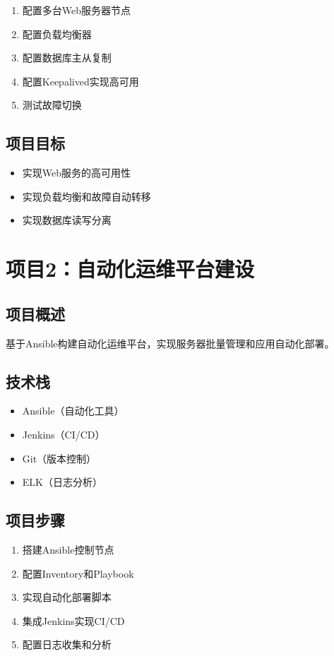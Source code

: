 \documentclass[12pt,UTF8]{ctexbook}
\begin{document}
\begin{enumerate}
    \item 配置多台Web服务器节点
    \item 配置负载均衡器
    \item 配置数据库主从复制
    \item 配置Keepalived实现高可用
    \item 测试故障切换
\end{enumerate}

\subsection*{项目目标}

\begin{itemize}
    \item 实现Web服务的高可用性
    \item 实现负载均衡和故障自动转移
    \item 实现数据库读写分离
\end{itemize}

\section{项目2：自动化运维平台建设}
\label{sec:project-automation}

\subsection*{项目概述}

基于Ansible构建自动化运维平台，实现服务器批量管理和应用自动化部署。

\subsection*{技术栈}

\begin{itemize}
    \item Ansible（自动化工具）
    \item Jenkins（CI/CD）
    \item Git（版本控制）
    \item ELK（日志分析）
\end{itemize}

\subsection*{项目步骤}

\begin{enumerate}
    \item 搭建Ansible控制节点
    \item 配置Inventory和Playbook
    \item 实现自动化部署脚本
    \item 集成Jenkins实现CI/CD
    \item 配置日志收集和分析
\end{enumerate}
\end{document}
